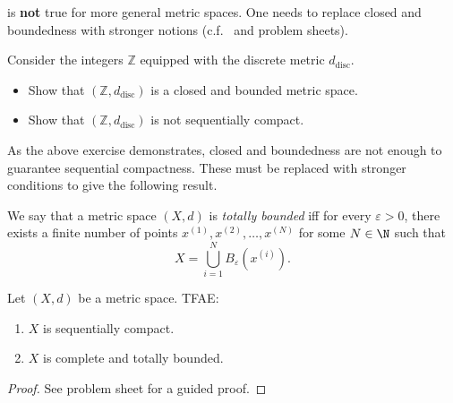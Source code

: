 \begin{rem}
	 is \textbf{not} true for more general metric spaces. One needs to replace closed and boundedness with stronger notions (c.f.~ and problem sheets).
\end{rem}
\begin{ex}
Consider the integers $\mathbb{Z}$ equipped with the discrete metric $d_\text{disc}$.
\begin{itemize}
	\item Show that $(\mathbb{Z},d_\text{disc})$ is a closed and bounded metric space.
	\item Show that $(\mathbb{Z},d_\text{disc})$ is not sequentially compact.
\end{itemize}
\end{ex}
As the above exercise demonstrates, closed and boundedness are not enough to guarantee sequential compactness. These must be replaced with stronger conditions to give the following result.
\begin{defn}
\label{defn:tot_bdd}
We say that a metric space $(X,d)$ is \textit{totally bounded} iff for every $\varepsilon>0$, there exists a finite number of points $x^{(1)},x^{(2)},\dots, x^{(N)}$ for some $N\in\N$ such that
\[
X = \bigcup_{i=1}^NB_\varepsilon(x^{(i)}).
\]
\end{defn}
\begin{thm}
\label{thm:hb_gen}
Let $(X,d)$ be a metric space. TFAE:
\begin{enumerate}
	\item \label{hb_1} $X$ is sequentially compact.
	\item \label{hb_2} $X$ is complete and totally bounded.
\end{enumerate}
\end{thm}
\begin{proof}
	See problem sheet for a guided proof.
\end{proof}


